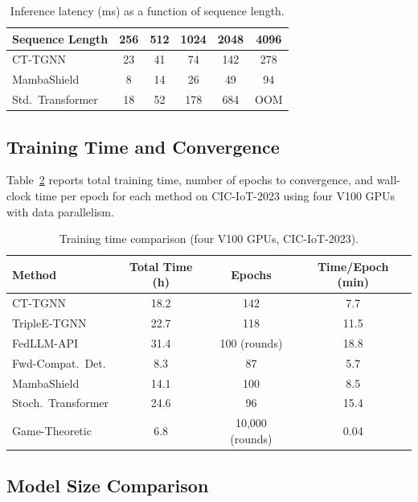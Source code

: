 \begin{table}[htbp]
\centering
\caption{Inference latency (ms) as a function of sequence length.}
\label{tab:app_scaling}
\begin{tabular}{lccccc}
\toprule
Sequence Length & 256 & 512 & 1024 & 2048 & 4096 \\
\midrule
CT-TGNN          & 23 & 41 & 74 & 142 & 278 \\
MambaShield      & 8  & 14 & 26 & 49  & 94  \\
Std.\ Transformer & 18 & 52 & 178 & 684 & OOM \\
\bottomrule
\end{tabular}
\end{table}


\subsection{Training Time and Convergence}
\label{app:training_time}

Table~\ref{tab:app_training} reports total training time, number of epochs to convergence, and wall-clock time per epoch for each method on CIC-IoT-2023 using four V100 GPUs with data parallelism.

\begin{table}[htbp]
\centering
\caption{Training time comparison (four V100 GPUs, CIC-IoT-2023).}
\label{tab:app_training}
\begin{tabular}{lccc}
\toprule
Method & Total Time (h) & Epochs & Time/Epoch (min) \\
\midrule
CT-TGNN            & 18.2 & 142 & 7.7 \\
TripleE-TGNN       & 22.7 & 118 & 11.5 \\
FedLLM-API         & 31.4 & 100 (rounds) & 18.8 \\
Fwd-Compat.\ Det.            & 8.3  & 87  & 5.7 \\
MambaShield        & 14.1 & 100 & 8.5 \\
Stoch.\ Transformer & 24.6 & 96  & 15.4 \\
Game-Theoretic     & 6.8  & 10{,}000 (rounds) & 0.04 \\
\bottomrule
\end{tabular}
\end{table}


\subsection{Model Size Comparison}
\label{app:model_size}

